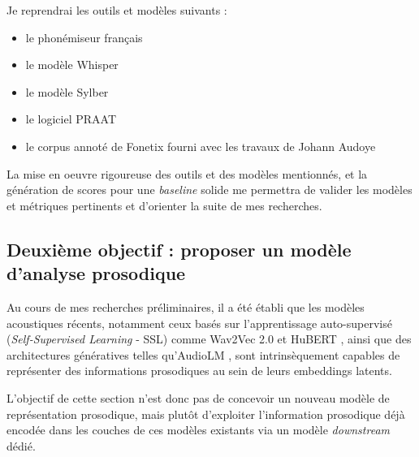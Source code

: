 \documentclass[11pt,a4paper]{article}
\begin{document}
Je reprendrai les outils et modèles suivants :
\begin{itemize}
    \item le phonémiseur français \cite{lmssc-wav2vec2-base-phonemizer-french_2023}
    \item le modèle Whisper \cite{radford2022robustspeechrecognitionlargescale}
    \item le modèle Sylber \cite{cho2025sylbersyllabicembeddingrepresentation}
    \item le logiciel PRAAT \cite{deJong04072021}
    \item le corpus annoté de Fonetix fourni avec les travaux de Johann Audoye
\end{itemize}

La mise en oeuvre rigoureuse des outils et des modèles mentionnés, et la génération de scores pour une \textit{baseline} solide me permettra de valider les modèles et métriques pertinents et d'orienter la suite de mes recherches.

\subsection{Deuxième objectif : proposer un modèle d'analyse prosodique}
Au cours de mes recherches préliminaires, il a été établi que les modèles acoustiques récents, notamment ceux basés sur l'apprentissage auto-supervisé (\textit{Self-Supervised Learning} - SSL) comme Wav2Vec 2.0 \cite{baevski2020wav2vec20frameworkselfsupervised} et HuBERT \cite{hsu2021hubertselfsupervisedspeechrepresentation}, ainsi que des architectures génératives telles qu'AudioLM \cite{borsos2023audiolmlanguagemodelingapproach} , sont intrinsèquement capables de représenter des informations prosodiques au sein de leurs embeddings latents. \newline 

L'objectif de cette section n'est donc pas de concevoir un nouveau modèle de représentation prosodique, mais plutôt d'exploiter l'information prosodique déjà encodée dans les couches de ces modèles existants via un modèle \textit{downstream} dédié.
\end{document}
